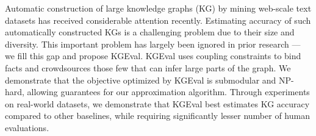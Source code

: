 Automatic construction of large knowledge graphs (KG) by mining web-scale text datasets has received considerable attention recently. Estimating accuracy of such automatically constructed KGs is a challenging problem due to their size and diversity. This important problem has largely been ignored in prior research --- we fill this gap and propose KGEval. KGEval uses coupling constraints to bind facts and crowdsources those few that can infer large parts of the graph. We demonstrate that the objective optimized by KGEval is submodular and NP-hard, allowing guarantees for our approximation algorithm. Through experiments on real-world datasets, we demonstrate that KGEval best estimates KG accuracy compared to other baselines, while requiring significantly lesser number of human evaluations.
